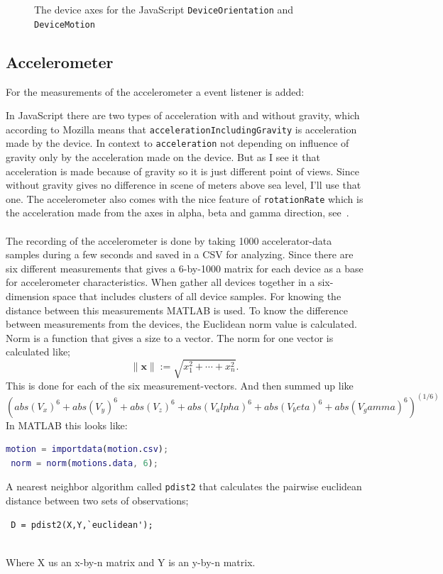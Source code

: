 \begin{figure}[H]
\begin{minipage}[c]{.23\textwidth}
    \hspace{1cm}
  \end{minipage}
  \caption{The device axes for the JavaScript \texttt{DeviceOrientation} and \texttt{DeviceMotion}}
  \label{fig:device-axes}
\end{figure}

\subsection{Accelerometer}
For the measurements of the accelerometer a event listener is added:

In JavaScript there are two types of acceleration with and without gravity, which according to Mozilla means that \texttt{accelerationIncludingGravity} is acceleration made by the device. In context to \texttt{acceleration} not depending on influence of gravity only by the acceleration made on the device. But as I see it that acceleration is made because of gravity so it is just different point of views. Since without gravity gives no difference in scene of meters above sea level, I'll use that one. The accelerometer also comes with the nice feature of \texttt{rotationRate} which is the acceleration made from the axes in alpha, beta and gamma direction, see~. \cite{sensor:accIncludingGravity}\\
\\
The recording of the accelerometer is done by taking 1000 accelerator-data samples during a few seconds and saved in a CSV for analyzing. Since there are six different measurements that gives a 6-by-1000 matrix for each device as a base for accelerometer characteristics. When gather all devices together in a six-dimension space that includes clusters of all device samples. For knowing the distance between this measurements MATLAB is used. To know the difference between measurements from the devices, the Euclidean norm value is calculated. Norm is a function that gives a size to a vector.  The norm for one vector is calculated like;
$$\|\boldsymbol{x}\| := \sqrt{x_1^2 + \cdots + x_n^2}.$$
This is done for each of the six measurement-vectors. And then summed up like
$$(abs(V_x)^6 + abs(V_y)^6 + abs(V_z)^6 + abs(V_alpha)^6 + abs(V_beta)^6 + abs(V_gamma)^6)^(1/6)$$
In MATLAB this looks like:
\begin{lstlisting}[language=Matlab]
 motion = importdata(motion.csv);
 norm = norm(motions.data, 6);
\end{lstlisting}
A nearest neighbor algorithm called \texttt{pdist2} that calculates the pairwise euclidean distance between two sets of observations;
\begin{lstlisting} 
 D = pdist2(X,Y,`euclidean'); 
 
\end{lstlisting}
Where X us an x-by-n matrix and Y is an y-by-n matrix. 

